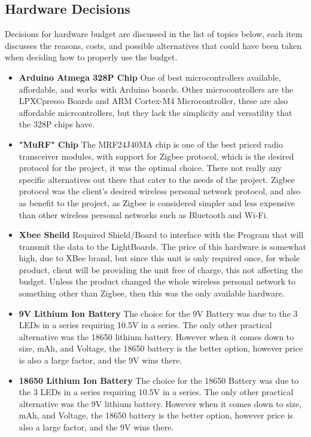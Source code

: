\documentclass[12pt]{article}
\begin{document}
{{{{{{{		\subsection{Hardware Decisions}
		Decisions for hardware budget are discussed in the list of topics below, each item discusses the reasons, costs, and possible alternatives that could have been taken when deciding how to properly use the budget.

		{\renewcommand\labelitemi{}
			\begin{itemize}
				\item \textbf{Arduino Atmega 328P Chip}
				One of best microcontrollers available, affordable, and works with Arduino boards. Other microcontrollers are the LPXCpresso Boards and ARM Cortex-M4 Microcontroller, these are also affordable micrcontrollers, but they lack the simplicity and versatility that the 328P chips have. 
				\item \textbf{"MuRF" Chip}
				The MRF24J40MA chip is one of the best priced radio transceiver modules, with support for Zigbee protocol, which is the desired protocol for the project, it was the optimal choice. There not really any specific alternatives out there that cater to the needs of the project. Zigbee protocol was the client's desired wireless personal network protocol, and also as benefit to the project, as Zigbee is considered simpler and less expensive than other wireless personal networks such as Bluetooth and Wi-Fi.
				\item \textbf{Xbee Sheild}
				Required Shield/Board to interface with the Program that will transmit the data to the LightBoards. The price of this hardware is somewhat high, due to XBee brand, but since this unit is only required once, for whole product, client will be providing the unit free of charge, this not affecting the budget. Unless the product changed the whole wireless personal network to something other than Zigbee, then this was the only available hardware. 
				\item \textbf{9V Lithium Ion Battery}
				The choice for the 9V Battery was due to the 3 LEDs in a series requiring 10.5V in a series. The only other practical alternative was the 18650 lithium battery. However when it comes down to size, mAh, and Voltage, the 18650 battery is the better option, however price is also a large factor, and the 9V wins there.
				\item \textbf{18650 Lithium Ion Battery}
				The choice for the 18650 Battery was due to the 3 LEDs in a series requiring 10.5V in a series. The only other practical alternative was the 9V lithium battery. However when it comes down to size, mAh, and Voltage, the 18650 battery is the better option, however price is also a large factor, and the 9V wins there.

\end{itemize}}}}}}}}}
\end{document}
